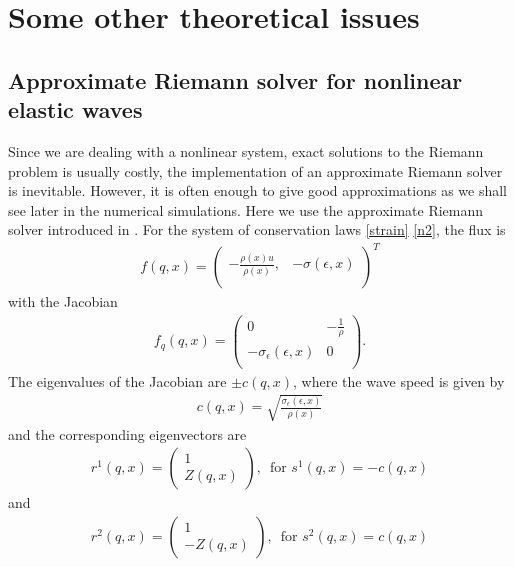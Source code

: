 \documentclass{article}
\begin{document}
\section{Some other theoretical issues}
\subsection{Approximate Riemann solver for nonlinear elastic waves}
Since we are dealing with a nonlinear system, exact solutions to the Riemann problem is usually costly, the implementation of an approximate Riemann solver is inevitable. However, it is often enough to give good approximations as we shall see later in the numerical simulations. Here we use the approximate Riemann solver introduced in \cite{leveque2003}. For the system of conservation laws \eqref{strain} \eqref{n2}, the flux is
\begin{align}
f(q,x)=\left(
                     \begin{array}{cc}
                       -\frac{\rho(x)u}{\rho(x)}, & -\sigma(\epsilon,x) \\
                     \end{array}
                   \right)^T
\end{align}
with the Jacobian
\begin{align}
f_q(q,x)=\left(
                     \begin{array}{cc}
                       0  &  -\frac{1}{\rho}\\
                       -\sigma_{\epsilon}(\epsilon,x) &  0 \\
                     \end{array}
                   \right).
\end{align}
The eigenvalues of the Jacobian are $\pm c(q,x)$, where the wave speed is given by
\begin{align}
c(q,x)=\sqrt{\frac{\sigma_{\epsilon}(\epsilon,x)}{\rho(x)}}
\label{sounds}
\end{align}
and the corresponding eigenvectors are
\begin{align}
r^1(q,x)=\left(
                     \begin{array}{c}
                       1 \\
                       Z(q,x)
                     \end{array}
                   \right)  ,\,\,\, \mbox{for } s^1(q,x)=-c(q,x)
\end{align}
and
\begin{align}
r^2(q,x)=\left(
                     \begin{array}{c}
                       1 \\
                       -Z(q,x)
                     \end{array}
                   \right)  ,\,\,\, \mbox{for } s^2(q,x)=c(q,x)
\end{align}
\end{document}
